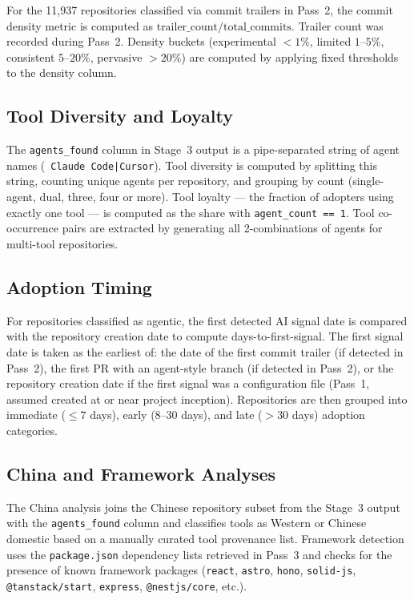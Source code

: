 For the 11,937 repositories classified via commit trailers in Pass~2, the commit density metric is computed as $\text{trailer\_count} / \text{total\_commits}$. Trailer count was recorded during Pass~2. Density buckets (experimental $<1\%$, limited $1$--$5\%$, consistent $5$--$20\%$, pervasive $>20\%$) are computed by applying fixed thresholds to the density column.

\subsection{Tool Diversity and Loyalty}

The \texttt{agents\_found} column in Stage~3 output is a pipe-separated string of agent names (\eg\ \texttt{Claude Code|Cursor}). Tool diversity is computed by splitting this string, counting unique agents per repository, and grouping by count (single-agent, dual, three, four or more). Tool loyalty --- the fraction of adopters using exactly one tool --- is computed as the share with \texttt{agent\_count == 1}. Tool co-occurrence pairs are extracted by generating all 2-combinations of agents for multi-tool repositories.

\subsection{Adoption Timing}

For repositories classified as agentic, the first detected AI signal date is compared with the repository creation date to compute days-to-first-signal. The first signal date is taken as the earliest of: the date of the first commit trailer (if detected in Pass~2), the first PR with an agent-style branch (if detected in Pass~2), or the repository creation date if the first signal was a configuration file (Pass~1, assumed created at or near project inception). Repositories are then grouped into immediate ($\leq 7$ days), early ($8$--$30$ days), and late ($>30$ days) adoption categories.

\subsection{China and Framework Analyses}

The China analysis joins the Chinese repository subset from the Stage~3 output with the \texttt{agents\_found} column and classifies tools as Western or Chinese domestic based on a manually curated tool provenance list. Framework detection uses the \texttt{package.json} dependency lists retrieved in Pass~3 and checks for the presence of known framework packages (\texttt{react}, \texttt{astro}, \texttt{hono}, \texttt{solid-js}, \texttt{@tanstack/start}, \texttt{express}, \texttt{@nestjs/core}, etc.).

